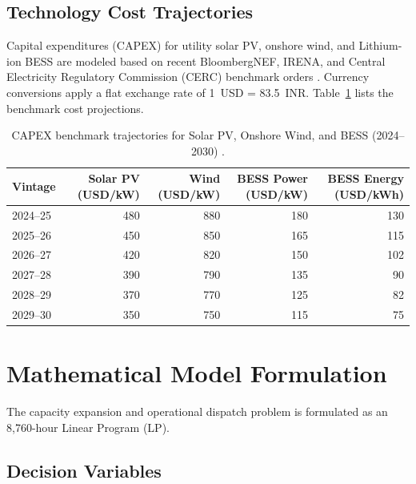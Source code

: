 \documentclass[11pt,a4paper]{article}
\begin{document}
\subsection{Technology Cost Trajectories}
\label{sec:costs}

Capital expenditures (CAPEX) for utility solar PV, onshore wind, and Lithium-ion BESS are modeled based on recent BloombergNEF, IRENA, and Central Electricity Regulatory Commission (CERC) benchmark orders \cite{IRENA2021, BNEF2023, CERC2024}. Currency conversions apply a flat exchange rate of 1~USD = 83.5~INR. Table~\ref{tab:capex_projections} lists the benchmark cost projections.

\begin{table}[htbp]
\centering
\small
\caption{CAPEX benchmark trajectories for Solar PV, Onshore Wind, and BESS (2024--2030) \cite{BNEF2023, CERC2024}.}
\label{tab:capex_projections}
\begin{tabular}{lrrrr}
\toprule
Vintage & Solar PV (USD/kW) & Wind (USD/kW) & BESS Power (USD/kW) & BESS Energy (USD/kWh) \\
\midrule
2024--25 & 480 & 880 & 180 & 130 \\
2025--26 & 450 & 850 & 165 & 115 \\
2026--27 & 420 & 820 & 150 & 102 \\
2027--28 & 390 & 790 & 135 & 90 \\
2028--29 & 370 & 770 & 125 & 82 \\
2029--30 & 350 & 750 & 115 & 75 \\
\bottomrule
\end{tabular}
\end{table}

\section{Mathematical Model Formulation}
\label{sec:model}

The capacity expansion and operational dispatch problem is formulated as an 8,760-hour Linear Program (LP).

\subsection{Decision Variables}
\label{sec:dec_vars}
\end{document}
